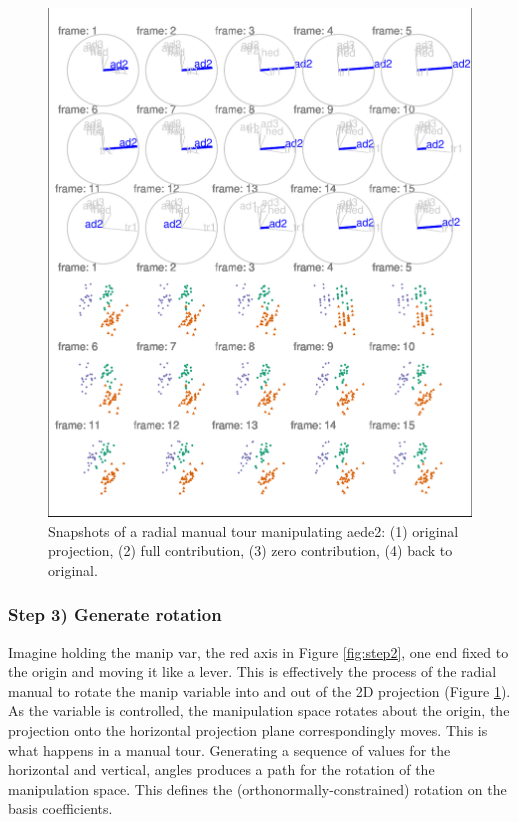 \begin{Schunk}
\begin{figure}

{\centering \includegraphics[width=1\linewidth]{spinifex_paper_files/figure-latex/step3-1} 

}

\caption[Snapshots of a radial manual tour manipulating aede2]{Snapshots of a radial manual tour manipulating aede2: (1) original projection, (2) full contribution, (3) zero contribution, (4) back to original. }\label{fig:step3}
\end{figure}
\end{Schunk}

\hypertarget{step-3-generate-rotation}{%
\subsubsection{Step 3) Generate
rotation}\label{step-3-generate-rotation}}

Imagine holding the manip var, the red axis in Figure \ref{fig:step2},
one end fixed to the origin and moving it like a lever. This is
effectively the process of the radial manual to rotate the manip
variable into and out of the 2D projection (Figure \ref{fig:step3}). As
the variable is controlled, the manipulation space rotates about the
origin, the projection onto the horizontal projection plane
correspondingly moves. This is what happens in a manual tour. Generating
a sequence of values for the horizontal and vertical, angles produces a
path for the rotation of the manipulation space. This defines the
(orthonormally-constrained) rotation on the basis coefficients.


